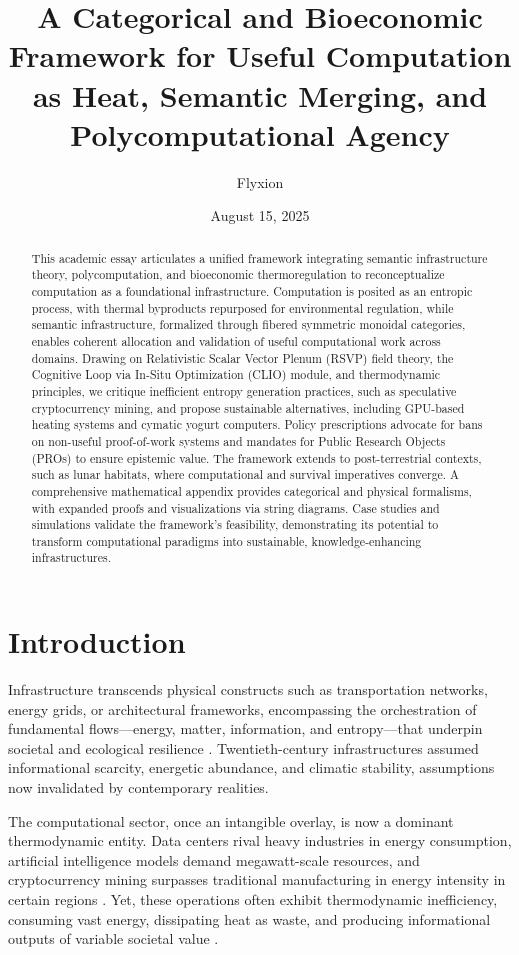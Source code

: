 \documentclass[12pt]{article}
\title{A Categorical and Bioeconomic Framework for Useful Computation as Heat, Semantic Merging, and Polycomputational Agency}
\author{Flyxion}
\date{August 15, 2025}
\begin{document}
\maketitle

\begin{abstract}
This academic essay articulates a unified framework integrating semantic infrastructure theory, polycomputation, and bioeconomic thermoregulation to reconceptualize computation as a foundational infrastructure. Computation is posited as an entropic process, with thermal byproducts repurposed for environmental regulation, while semantic infrastructure, formalized through fibered symmetric monoidal categories, enables coherent allocation and validation of useful computational work across domains. Drawing on Relativistic Scalar Vector Plenum (RSVP) field theory, the Cognitive Loop via In-Situ Optimization (CLIO) module, and thermodynamic principles, we critique inefficient entropy generation practices, such as speculative cryptocurrency mining, and propose sustainable alternatives, including GPU-based heating systems and cymatic yogurt computers. Policy prescriptions advocate for bans on non-useful proof-of-work systems and mandates for Public Research Objects (PROs) to ensure epistemic value. The framework extends to post-terrestrial contexts, such as lunar habitats, where computational and survival imperatives converge. A comprehensive mathematical appendix provides categorical and physical formalisms, with expanded proofs and visualizations via string diagrams. Case studies and simulations validate the framework's feasibility, demonstrating its potential to transform computational paradigms into sustainable, knowledge-enhancing infrastructures.
\end{abstract}

\section{Introduction}
\label{sec:introduction}

Infrastructure transcends physical constructs such as transportation networks, energy grids, or architectural frameworks, encompassing the orchestration of fundamental flows---energy, matter, information, and entropy---that underpin societal and ecological resilience \citep{DalyFarley2011}. Twentieth-century infrastructures assumed informational scarcity, energetic abundance, and climatic stability, assumptions now invalidated by contemporary realities.

The computational sector, once an intangible overlay, is now a dominant thermodynamic entity. Data centers rival heavy industries in energy consumption, artificial intelligence models demand megawatt-scale resources, and cryptocurrency mining surpasses traditional manufacturing in energy intensity in certain regions \citep{Markov2014, DeVries2021}. Yet, these operations often exhibit thermodynamic inefficiency, consuming vast energy, dissipating heat as waste, and producing informational outputs of variable societal value \citep{Landauer1961}.
\end{document}
